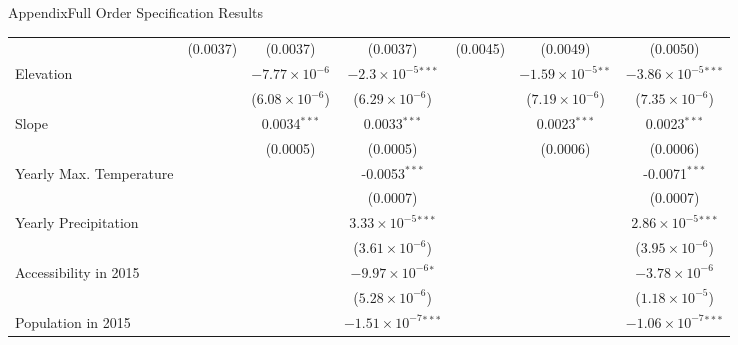 \documentclass[aspectratio=169,11pt,dvipsnames, handout]{beamer}
\begin{document}
\begin{frame}{\textcolor{defaultclr!30}{Appendix}\hspace{0.75em}Full Order Specification Results}
\begin{adjustbox}{width=0.45\textwidth, center}
\begin{tabular}{lcccccc}
                                & (0.0037)        & (0.0037)                & (0.0037)                       & (0.0045)        & (0.0049)                      & (0.0050)\\   
      Elevation                 &                 & $-7.77\times 10^{-6}$   & $-2.3\times 10^{-5}$$^{***}$   &                 & $-1.59\times 10^{-5}$$^{**}$  & $-3.86\times 10^{-5}$$^{***}$\\    
                                &                 & ($6.08\times 10^{-6}$)  & ($6.29\times 10^{-6}$)         &                 & ($7.19\times 10^{-6}$)        & ($7.35\times 10^{-6}$)\\    
      Slope                     &                 & 0.0034$^{***}$          & 0.0033$^{***}$                 &                 & 0.0023$^{***}$                & 0.0023$^{***}$\\   
                                &                 & (0.0005)                & (0.0005)                       &                 & (0.0006)                      & (0.0006)\\   
      Yearly Max. Temperature   &                 &                         & -0.0053$^{***}$                &                 &                               & -0.0071$^{***}$\\   
                                &                 &                         & (0.0007)                       &                 &                               & (0.0007)\\   
      Yearly Precipitation      &                 &                         & $3.33\times 10^{-5}$$^{***}$   &                 &                               & $2.86\times 10^{-5}$$^{***}$\\    
                                &                 &                         & ($3.61\times 10^{-6}$)         &                 &                               & ($3.95\times 10^{-6}$)\\    
      Accessibility in 2015     &                 &                         & $-9.97\times 10^{-6}$$^{*}$    &                 &                               & $-3.78\times 10^{-6}$\\    
                                &                 &                         & ($5.28\times 10^{-6}$)         &                 &                               & ($1.18\times 10^{-5}$)\\    
      Population in 2015        &                 &                         & $-1.51\times 10^{-7}$$^{***}$  &                 &                               & $-1.06\times 10^{-7}$$^{***}$\\    

\end{tabular}
\end{adjustbox}
\end{frame}
\end{document}
